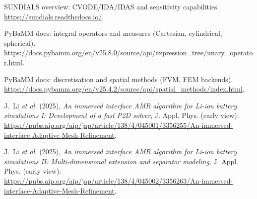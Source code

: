 \documentclass[11pt]{article}
\begin{document}
\begin{thebibliography}{99}
SUNDIALS overview: CVODE/IDA/IDAS and sensitivity capabilities. \url{https://sundials.readthedocs.io/}.

PyBaMM docs: integral operators and measures (Cartesian, cylindrical, spherical). \url{https://docs.pybamm.org/en/v25.8.0/source/api/expression_tree/unary_operator.html}.

PyBaMM docs: discretisation and spatial methods (FVM, FEM backends). \url{https://docs.pybamm.org/en/v25.4.2/source/api/spatial_methods/index.html}.

J.~Li \emph{et al.} (2025), \emph{An immersed interface AMR algorithm for Li-ion battery simulations I: Development of a fast P2D solver}, J. Appl. Phys. (early view). \url{https://pubs.aip.org/aip/jap/article/138/4/045001/3356255/An-immersed-interface-Adaptive-Mesh-Refinement}.

J.~Li \emph{et al.} (2025), \emph{An immersed interface AMR algorithm for Li-ion battery simulations II: Multi-dimensional extension and separator modeling}, J. Appl. Phys. (early view). \url{https://pubs.aip.org/aip/jap/article/138/4/045002/3356263/An-immersed-interface-Adaptive-Mesh-Refinement}.
\end{thebibliography}
\end{document}
